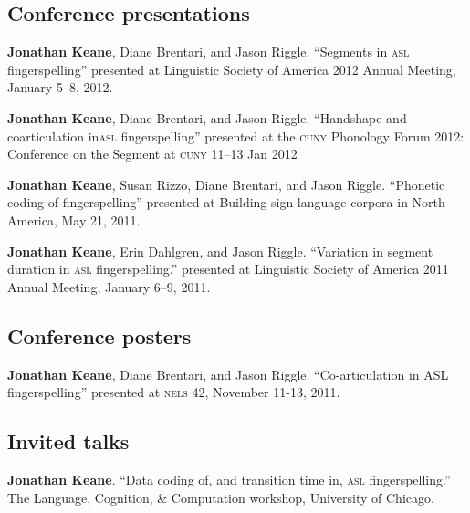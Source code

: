 \documentclass[10pt, letterpaper]{article}
\newcommand{\years}[1]{\marginpar{\scriptsize #1}}
\begin{document}
\subsection*{Conference presentations}
\begin{hangparas}{1em}{1}
\-\years{2012} \textbf{Jonathan Keane}, Diane Brentari, and Jason Riggle. “Segments in \textsc{asl} fingerspelling” presented at Linguistic Society of America 2012 Annual Meeting, January 5--8, 2012. 

\-\years{2012} \textbf{Jonathan Keane}, Diane Brentari, and Jason Riggle. “Handshape and coarticulation in\textsc{asl} fingerspelling” presented at the \textsc{cuny} Phonology Forum 2012: Conference on the Segment at \textsc{cuny} 11--13 Jan 2012

\-\years{2011} \textbf{Jonathan Keane}, Susan Rizzo, Diane Brentari, and Jason Riggle. “Phonetic coding of fingerspelling” presented at Building sign language corpora in North America, May 21, 2011. 

  \-\years{2011} \textbf{Jonathan Keane}, Erin Dahlgren, and Jason Riggle. “Variation in segment duration in \textsc{asl} fingerspelling.” presented at Linguistic Society of America 2011 Annual Meeting, January 6--9, 2011. 
\end{hangparas}

\vspace{2ex}
\subsection*{Conference posters}
\begin{hangparas}{1em}{1}
\-\years{2011} \textbf{Jonathan Keane}, Diane Brentari, and Jason Riggle. “Co-articulation in ASL fingerspelling” presented at \textsc{nels} 42, November 11-13, 2011. 
\end{hangparas}


\vspace{2ex}
\subsection*{Invited talks}
\begin{hangparas}{1em}{1}
  \-\years{2011} \textbf{Jonathan Keane}. “Data coding of, and transition time in, \textsc{asl} fingerspelling.” The Language, Cognition, \& Computation workshop, University of Chicago. 
\end{hangparas}
\end{document}
